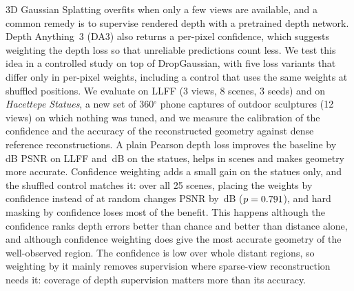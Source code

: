 3D Gaussian Splatting overfits when only a few views are available, and a common remedy is to supervise rendered depth with a pretrained depth network. Depth Anything~3 (DA3) also returns a per-pixel confidence, which suggests weighting the depth loss so that unreliable predictions count less. We test this idea in a controlled study on top of DropGaussian, with five loss variants that differ only in per-pixel weights, including a control that uses the same weights at shuffled positions. We evaluate on LLFF (3 views, 8 scenes, 3 seeds) and on \emph{Hacettepe Statues}, a new set of \statuesnscenes{} 360$^\circ$ phone captures of outdoor sculptures (12 views) on which nothing was tuned, and we measure the calibration of the confidence and the accuracy of the reconstructed geometry against dense reference reconstructions. A plain Pearson depth loss improves the baseline by \LLFFVoneminusVzerodpsnr{}\,dB PSNR on LLFF and \StatuesVoneminusVzerodpsnr{}\,dB on the statues, helps in \BothVoneminusVzerowins{} scenes and makes geometry more accurate. Confidence weighting adds a small gain on the statues only, and the shuffled control matches it: over all 25 scenes, placing the weights by confidence instead of at random changes PSNR by \BothVtwominusVfourdpsnr{}\,dB ($p=0.791$), and hard masking by confidence loses most of the benefit. This happens although the confidence ranks depth errors better than chance and better than distance alone, and although confidence weighting does give the most accurate geometry of the well-observed region. The confidence is low over whole distant regions, so weighting by it mainly removes supervision where sparse-view reconstruction needs it: coverage of depth supervision matters more than its accuracy.
